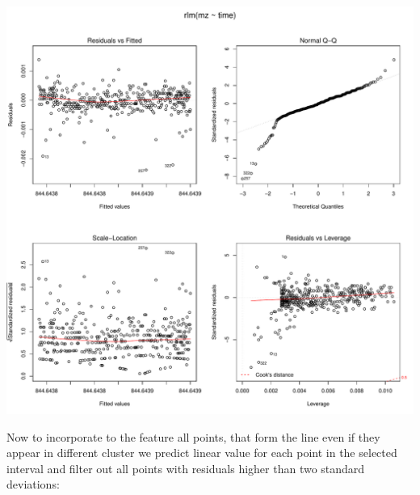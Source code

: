 \documentclass[]{article}
\newenvironment{Shaded}{\begin{snugshade}}{\end{snugshade}}
\newcommand{\KeywordTok}[1]{\textcolor[rgb]{0.13,0.29,0.53}{\textbf{#1}}}
\newcommand{\DataTypeTok}[1]{\textcolor[rgb]{0.13,0.29,0.53}{#1}}
\newcommand{\DecValTok}[1]{\textcolor[rgb]{0.00,0.00,0.81}{#1}}
\newcommand{\StringTok}[1]{\textcolor[rgb]{0.31,0.60,0.02}{#1}}
\newcommand{\ControlFlowTok}[1]{\textcolor[rgb]{0.13,0.29,0.53}{\textbf{#1}}}
\newcommand{\OperatorTok}[1]{\textcolor[rgb]{0.81,0.36,0.00}{\textbf{#1}}}
\newcommand{\NormalTok}[1]{#1}
\begin{document}
\begin{Shaded}
\end{Shaded}

\includegraphics{Supplementary_document_files/figure-latex/fit.lin.huber-1.pdf}

Now to incorporate to the feature all points, that form the line even if
they appear in different cluster we predict linear value for each point
in the selected interval and filter out all points with residuals higher
than two standard deviations:
\end{document}
